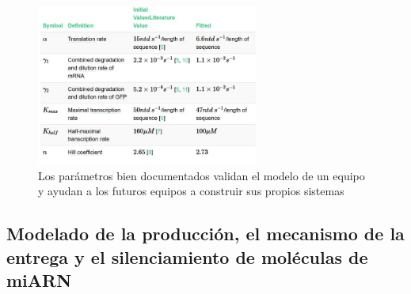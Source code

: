 \documentclass[11pt, letterpaper, spanish]{article}
\begin{document}
{{\begin{figure}
	    \centering
		\caption{Los parámetros bien documentados validan el modelo de un equipo y ayudan a los futuros equipos a construir sus propios sistemas \cite{iGEMOxford_2015}}
		\includegraphics[width=0.65\textwidth]{Tabla parametros.JPG}
	\end{figure}
	\vspace{0.3 cm}


     \subsection{Modelado de la producción, el mecanismo de la entrega y el silenciamiento de
moléculas de miARN}

}}
\end{document}
